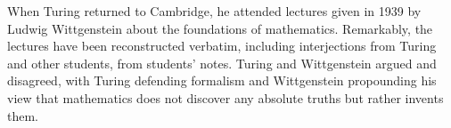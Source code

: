 \documentclass[a4paper,12pt]{article}
\begin{document}
When Turing returned to Cambridge, he attended lectures given in 1939 by Ludwig Wittgenstein about the foundations of mathematics. Remarkably, the lectures have been reconstructed verbatim, including interjections from Turing and other students, from students' notes. Turing and Wittgenstein argued and disagreed, with Turing defending formalism and Wittgenstein propounding his view that mathematics does not discover any absolute truths but rather invents them.

\cite{5966527,Yang:2010:GCM:1809028.1806606}



\end{document}

